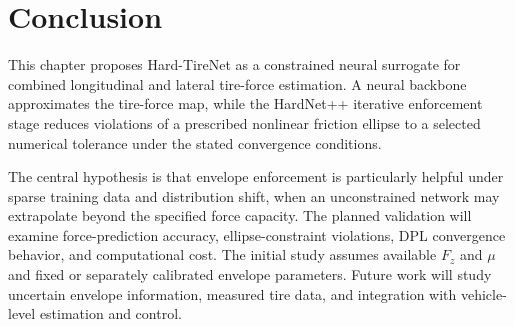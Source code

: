 \section{Conclusion}
\label{Tire:sec:conclusion}

This chapter proposes Hard-TireNet as a constrained neural surrogate for
combined longitudinal and lateral tire-force estimation. A neural backbone
approximates the tire-force map, while the HardNet++ iterative enforcement
stage reduces violations of a prescribed nonlinear friction ellipse to a
selected numerical tolerance under the stated convergence conditions.

The central hypothesis is that envelope enforcement is particularly helpful
under sparse training data and distribution shift, when an unconstrained
network may extrapolate beyond the specified force capacity. The planned
validation will examine force-prediction accuracy, ellipse-constraint
violations, DPL convergence behavior, and computational cost. The initial study
assumes available $F_z$ and $\mu$ and fixed or separately calibrated envelope
parameters. Future work will study uncertain envelope information, measured
tire data, and integration with vehicle-level estimation and control.
